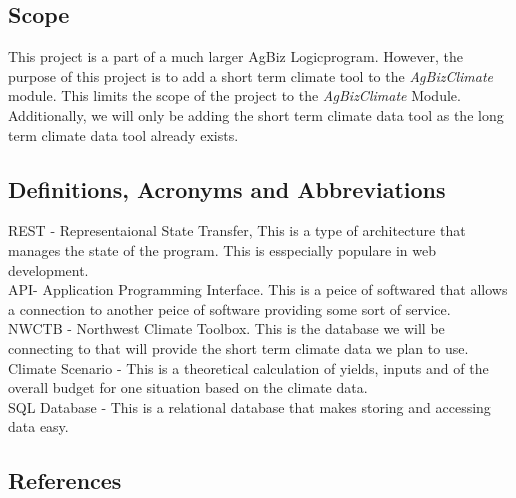 \documentclass[onecolumn, draftclsnofoot,10pt, compsoc]{article}
\begin{document}
		\subsection{Scope}
			This project is a part of a much larger AgBiz Logic\texttrademark program. However, the purpose of this project is to add a short term climate tool to the \textit{AgBizClimate} module. This limits the scope of the project to the \textit{AgBizClimate} Module. Additionally, we will only be adding the short term climate data tool as the long term climate data tool already exists.\\

		\subsection{Definitions, Acronyms and Abbreviations}
			REST - Representaional State Transfer, This is a type of architecture that manages the state of the program. This is esspecially populare in web development.\\
			API- Application Programming Interface. This is a peice of softwared that allows a connection to another peice of software providing some sort of service.\\
			NWCTB - Northwest Climate Toolbox. This is the database we will be connecting to that will provide the short term climate data we plan to use.\\
			Climate Scenario - This is a theoretical calculation of yields, inputs and of the overall budget for one situation based on the climate data.\\
			SQL Database - This is a relational database that makes storing and accessing data easy.\\

			\renewcommand\refname{\vskip -1cm}
		\subsection{References}

		\nocite{*}
    
    
\end{document}
